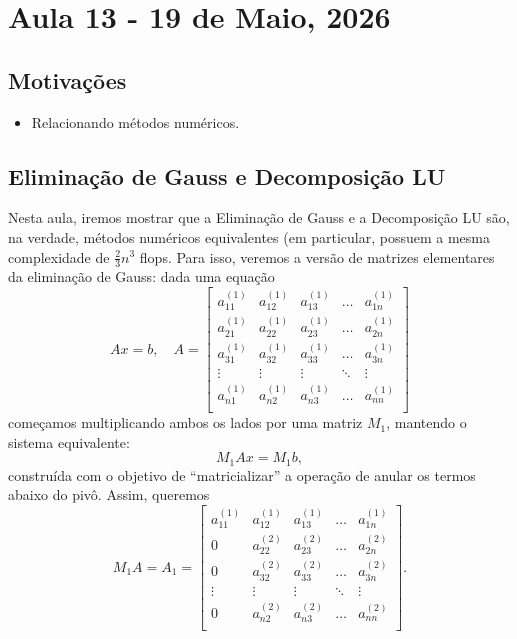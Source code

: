 \documentclass[../numerical_methods.tex]{subfiles}
\begin{document}
\section{Aula 13 - 19 de Maio, 2026}
\subsection{Motivações}
\begin{itemize}
	\item Relacionando métodos numéricos.
\end{itemize}
\subsection{Eliminação de Gauss e Decomposição LU}
Nesta aula, iremos mostrar que a Eliminação de Gauss e a Decomposição LU são, na verdade, métodos numéricos equivalentes (em particular, possuem a mesma complexidade de \(\frac{2}{3}n^{3}\) flops.
Para isso, veremos a versão de matrizes elementares da eliminação de Gauss: dada uma equação
\[
	Ax = b, \quad A = \begin{bmatrix}
		a_{11}^{(1)} & a_{12}^{(1)} & a_{13}^{(1)} & \dotsc & a_{1n}^{(1)} \\
		a_{21}^{(1)} & a_{22}^{(1)} & a_{23}^{(1)} & \dotsc & a_{2n}^{(1)} \\
		a_{31}^{(1)} & a_{32}^{(1)} & a_{33}^{(1)} & \dotsc & a_{3n}^{(1)} \\
		\vdots       & \vdots       & \vdots       & \ddots & \vdots       \\
		a_{n1}^{(1)} & a_{n2}^{(1)} & a_{n3}^{(1)} & \dotsc & a_{nn}^{(1)} \\
	\end{bmatrix}
\]
começamos multiplicando ambos os lados por uma matriz \(M_{1}\), mantendo o sistema equivalente:
\[
	M_1 Ax = M_1 b,
\]
construída com o objetivo de ``matricializar'' a operação de anular os termos abaixo do pivô. Assim, queremos
\[
	M_{1}A = A_{1} = \begin{bmatrix}
		a_{11}^{(1)} & a_{12}^{(1)} & a_{13}^{(1)} & \dotsc & a_{1n}^{(1)} \\
		0            & a_{22}^{(2)} & a_{23}^{(2)} & \dotsc & a_{2n}^{(2)} \\
		0            & a_{32}^{(2)} & a_{33}^{(2)} & \dotsc & a_{3n}^{(2)} \\
		\vdots       & \vdots       & \vdots       & \ddots & \vdots       \\
		0            & a_{n2}^{(2)} & a_{n3}^{(2)} & \dotsc & a_{nn}^{(2)} \\
	\end{bmatrix}.
\]
\end{document}
